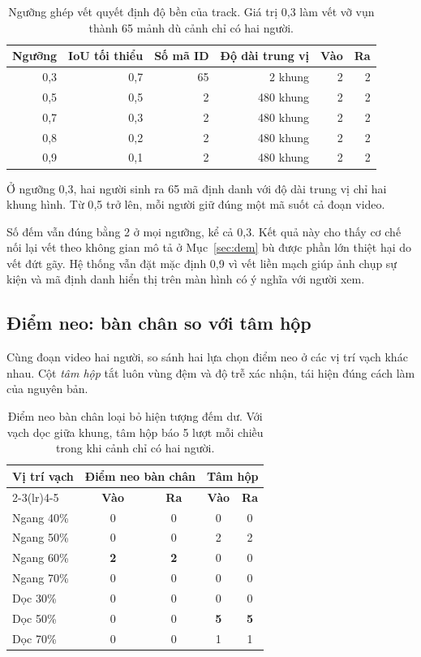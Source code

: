 \begin{table}[H]
\centering
\caption{Ngưỡng ghép vết quyết định độ bền của track. Giá trị 0{,}3 làm vết vỡ
vụn thành 65 mảnh dù cảnh chỉ có hai người.}
\label{tab:bytetrack}
\small
\begin{tabular}{@{}rrrrrr@{}}
\toprule
\textbf{Ngưỡng} & \textbf{IoU tối thiểu} & \textbf{Số mã ID} &
\textbf{Độ dài trung vị} & \textbf{Vào} & \textbf{Ra} \\
\midrule
0{,}3 & 0{,}7 & 65 & 2 khung   & 2 & 2 \\
0{,}5 & 0{,}5 & 2  & 480 khung & 2 & 2 \\
0{,}7 & 0{,}3 & 2  & 480 khung & 2 & 2 \\
0{,}8 & 0{,}2 & 2  & 480 khung & 2 & 2 \\
0{,}9 & 0{,}1 & 2  & 480 khung & 2 & 2 \\
\bottomrule
\end{tabular}
\end{table}

Ở ngưỡng 0{,}3, hai người sinh ra 65 mã định danh với độ dài trung vị chỉ hai
khung hình. Từ 0{,}5 trở lên, mỗi người giữ đúng một mã suốt cả đoạn video.

Số đếm vẫn đúng bằng 2 ở mọi ngưỡng, kể cả 0{,}3. Kết quả này cho thấy cơ chế nối
lại vết theo không gian mô tả ở Mục~\ref{sec:dem} bù được phần lớn thiệt hại do
vết đứt gãy. Hệ thống vẫn đặt mặc định 0{,}9 vì vết liền mạch giúp ảnh chụp sự
kiện và mã định danh hiển thị trên màn hình có ý nghĩa với người xem.

\subsection{Điểm neo: bàn chân so với tâm hộp}


Cùng đoạn video hai người, so sánh hai lựa chọn điểm neo ở các vị trí vạch khác
nhau. Cột \emph{tâm hộp} tắt luôn vùng đệm và độ trễ xác nhận, tái hiện đúng cách
làm của  nguyên bản.

\begin{table}[H]
\centering
\caption{Điểm neo bàn chân loại bỏ hiện tượng đếm dư. Với vạch dọc giữa khung,
tâm hộp báo 5 lượt mỗi chiều trong khi cảnh chỉ có hai người.}
\label{tab:anchor}
\small
\begin{tabular}{@{}lcccc@{}}
\toprule
\multirow{2}{*}{\textbf{Vị trí vạch}} &
\multicolumn{2}{c}{\textbf{Điểm neo bàn chân}} &
\multicolumn{2}{c}{\textbf{Tâm hộp}} \\
\cmidrule(lr){2-3}\cmidrule(lr){4-5}
 & \textbf{Vào} & \textbf{Ra} & \textbf{Vào} & \textbf{Ra} \\
\midrule
Ngang 40\% & 0 & 0 & 0 & 0 \\
Ngang 50\% & 0 & 0 & 2 & 2 \\
Ngang 60\% & \textbf{2} & \textbf{2} & 0 & 0 \\
Ngang 70\% & 0 & 0 & 0 & 0 \\
Dọc 30\%   & 0 & 0 & 0 & 0 \\
Dọc 50\%   & 0 & 0 & \textbf{5} & \textbf{5} \\
Dọc 70\%   & 0 & 0 & 1 & 1 \\
\bottomrule
\end{tabular}
\end{table}

